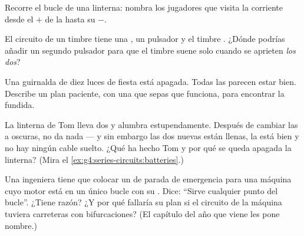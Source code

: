 \begin{exercise}[$\star$]\label{exo:g4:series-circuits:7}
Recorre el bucle de una linterna: nombra los jugadores que visita la
corriente desde el $+$ de la  hasta su $-$.
\end{exercise}

\begin{exercise}[$\star$]\label{exo:g4:series-circuits:8}
El circuito de un timbre tiene una , un pulsador y el timbre
. ¿Dónde podrías añadir un segundo pulsador para que el
timbre suene solo cuando se aprieten \emph{los dos}?
\end{exercise}

\begin{exercise}[$\star$]\label{exo:g4:series-circuits:9}
Una guirnalda de diez luces de fiesta  está apagada. Todas
las  parecen estar bien. Describe un plan paciente, con una
 que sepas que funciona, para encontrar la fundida.
\end{exercise}

\begin{exercise}[$\star\star$]\label{exo:g4:series-circuits:10}
La linterna de Tom lleva dos  y alumbra estupendamente. Después
de cambiar las  a oscuras, no da nada --- y sin embargo las dos
 nuevas están llenas, la  está bien y no hay ningún
cable suelto. ¿Qué ha hecho Tom y por qué se queda apagada la
linterna? (Mira el \cref{ex:g4:series-circuits:batteries}.)
\end{exercise}

\begin{exercise}[$\star\star$]\label{exo:g4:series-circuits:11}
Una ingeniera tiene que colocar un  de parada de
emergencia para una máquina cuyo motor está en un único bucle con su
. Dice: ``Sirve cualquier punto del bucle''. ¿Tiene razón? ¿Y
por qué fallaría su plan si el circuito de la máquina tuviera
carreteras con bifurcaciones? (El capítulo del año que viene les pone
nombre.)
\end{exercise}
